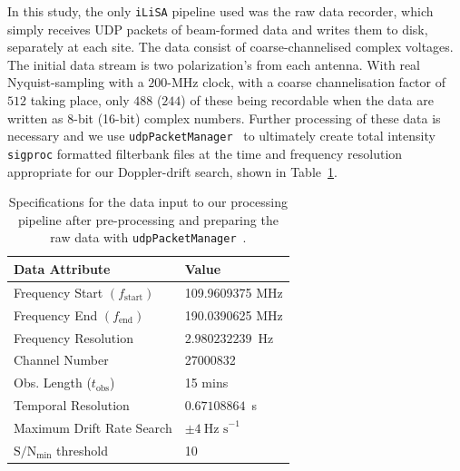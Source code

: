 In this study, the only \texttt{iLiSA} pipeline used was the raw data recorder, which simply receives UDP packets of beam-formed data and writes them to disk, separately at each site. The data consist of coarse-channelised complex voltages. The initial data stream is two polarization's from each antenna. With real Nyquist-sampling with a $200$-MHz clock, with a coarse channelisation factor of $512$ taking place, only $488$ ($244$) of these being recordable when the data are written as 8-bit (16-bit) complex numbers. Further processing of these data is necessary and we use \texttt{udpPacketManager}~\citep{David_JOSS} to ultimately create total intensity  \texttt{sigproc} \citep{lorimerSIGPROCPulsarSignal2011} formatted filterbank files at the time and frequency resolution appropriate for our Doppler-drift search, shown in Table~\ref{tab:data_details}.

\begin{table}[ht]
\centering
\begin{tabular}{ll}
\hline
\textbf{Data Attribute} & \textbf{Value} \\
\hline
Frequency Start $(f_\text{start})$ & 109.9609375 MHz \\
Frequency End $(f_\text{end})$ & 190.0390625 MHz \\
Frequency Resolution & $2.980232239$~Hz \\
Channel Number & 27000832 \\
Obs. Length ($t_{\mathrm{obs}}$) & 15 mins \\
Temporal Resolution & $0.67108864$~s \\
Maximum Drift Rate Search & $\pm4 \ \text{Hz s}^{-1}$ \\
$\text{S}/\text{N}_{\text{min}}$ threshold & 10 \\
\hline
\end{tabular}
\caption{Specifications for the data input to our processing pipeline after pre-processing and preparing the raw data with \texttt{udpPacketManager}~\citep{David_JOSS}.}
\label{tab:data_details}
\end{table}

